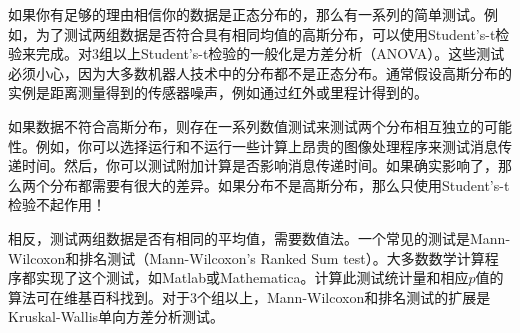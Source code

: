 
如果你有足够的理由相信你的数据是正态分布的，那么有一系列的简单测试。例如，为了测试两组数据是否符合具有相同均值的高斯分布，可以使用Student's-t检验来完成。对3组以上Student's-t检验的一般化是方差分析（ANOVA）。这些测试必须小心，因为大多数机器人技术中的分布都不是正态分布。通常假设高斯分布的实例是距离测量得到的传感器噪声，例如通过红外或里程计得到的。


如果数据不符合高斯分布，则存在一系列数值测试来测试两个分布相互独立的可能性。例如，你可以选择运行和不运行一些计算上昂贵的图像处理程序来测试消息传递时间。然后，你可以测试附加计算是否影响消息传递时间。如果确实影响了，那么两个分布都需要有很大的差异。如果分布不是高斯分布，那么只使用Student's-t检验不起作用！


相反，测试两组数据是否有相同的平均值，需要数值法。一个常见的测试是Mann-Wilcoxon和排名测试（Mann-Wilcoxon's Ranked Sum test）。大多数数学计算程序都实现了这个测试，如Matlab或Mathematica。计算此测试统计量和相应$p$值的算法可在维基百科找到。对于3个组以上，Mann-Wilcoxon和排名测试的扩展是Kruskal-Wallis单向方差分析测试。

